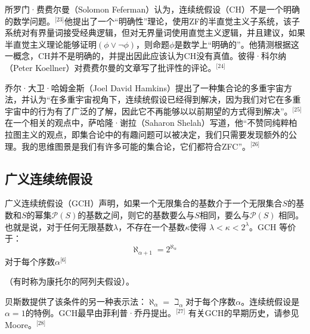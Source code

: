 所罗门·费费尔曼（Solomon Feferman）认为，连续统假设（CH）不是一个明确的数学问题。\(^\text{[23]}\)他提出了一个“明确性”理论，使用ZF的半直觉主义子系统，该子系统对有界量词接受经典逻辑，但对无界量词使用直觉主义逻辑，并且建议，如果半直觉主义理论能够证明\( (\phi \lor \neg \phi) \)，则命题\( \phi \)是数学上“明确的”。他猜测根据这一概念，CH并不是明确的，并提出因此应该认为CH没有真值。彼得·科尔纳（Peter Koellner）对费费尔曼的文章写了批评性的评论。\(^\text{[24]}\)

乔尔·大卫·哈姆金斯（Joel David Hamkins）提出了一种集合论的多重宇宙方法，并认为“在多重宇宙视角下，连续统假设已经得到解决，因为我们对它在多重宇宙中的行为有了广泛的了解，因此它不再能够以以前期望的方式得到解决”。\(^\text{[25]}\)在一个相关的观点中，萨哈隆·谢拉（Saharon Shelah）写道，他“不赞同纯粹柏拉图主义的观点，即集合论中的有趣问题可以被决定，我们只需要发现额外的公理。我的思维图景是我们有许多可能的集合论，它们都符合ZFC”。\(^\text{[26]}\)
\subsection{广义连续统假设}  
广义连续统假设（GCH）声明，如果一个无限集合的基数介于一个无限集合\( S \)的基数和\( S \)的幂集\( \mathcal{P}(S) \)的基数之间，则它的基数要么与\( S \)相同，要么与\( \mathcal{P}(S) \) 相同。也就是说，对于任何无限基数\( \lambda \)，不存在一个基数\( \kappa \)使得 \( \lambda < \kappa < 2^\lambda \)。GCH 等价于：
\[
\aleph_{\alpha + 1} = 2^{\aleph_{\alpha}}~
\]
对于每个序数\( \alpha \)\(^\text{[6]}\)  

（有时称为康托尔的阿列夫假设）。

贝斯数提供了该条件的另一种表示法：\(\aleph_{\alpha} = \beth_{\alpha}\)对于每个序数\( \alpha \)。连续统假设是\( \alpha = 1 \)的特例。GCH最早由菲利普·乔丹提出。\(^\text{[27]}\) 有关GCH的早期历史，请参见Moore。\(^\text{[28]}\) 